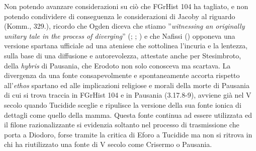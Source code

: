 {            Non potendo avanzare considerazioni su ciò che FGrHist 104 ha tagliato, e non potendo condividere di conseguenza le considerazioni di Jacoby al riguardo (Komm., 329.), ricordo  che Ogden diceva che stiamo ''\emph{witnessing an originally unitary tale in the process of diverging}'' (\cite{Carawan1989}; \cite{Westlake1977}; \cite[113]{Ogden2002})\label{ref:stesimbrotofontedithuc} e che Nafissi (\cite*[179]{Nafissi2004}) opponeva una versione spartana ufficiale ad una ateniese che sottolinea l'incuria e la lentezza, sulla base di una diffusione e autorevolezza, attestate anche per Stesimbroto, della \emph{hybris} di Pausania, che Erodoto non solo conosceva ma scartava. La divergenza da una fonte consapevolmente e spontaneamente accorta rispetto all'\emph{ethos} spartano ed alle implicazioni religiose e morali della morte di Pausania  di cui si trova traccia in FGrHist 104 e in Pausania (3.17.8-9), avviene già nel V secolo quando Tucidide sceglie e ripulisce la versione della sua fonte ionica di dettagli come quello della mamma. Questa fonte continua ad essere utilizzata ed il filone razionalizzante si evidenzia soltanto nel processo di trasmissione che porta a Diodoro, forse tramite la critica di Eforo a Tucidide ma non si ritrova in chi ha riutilizzato una fonte di V secolo come Crisermo o Pausania.
}

